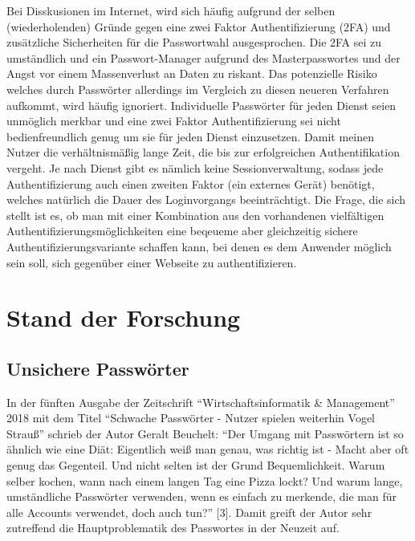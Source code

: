 Bei Disskusionen im Internet, wird sich häufig aufgrund der selben (wiederholenden) Gründe gegen eine zwei Faktor Authentifizierung (2FA) und zusätzliche Sicherheiten für die Passwortwahl ausgesprochen. Die 2FA sei zu umständlich und ein Passwort-Manager aufgrund des Masterpasswortes und der Angst vor einem Massenverlust an Daten zu riskant. Das potenzielle Risiko welches durch Passwörter allerdings im Vergleich zu diesen neueren Verfahren aufkommt, wird häufig ignoriert. Individuelle Passwörter für jeden Dienst seien unmöglich merkbar und eine zwei Faktor Authentifizierung sei nicht bedienfreundlich genug um sie für jeden Dienst einzusetzen. Damit meinen Nutzer die verhältnismäßig lange Zeit, die bis zur erfolgreichen Authentifikation vergeht. Je nach Dienst gibt es nämlich keine Sessionverwaltung, sodass jede Authentifizierung auch einen zweiten Faktor (ein externes Gerät) benötigt, welches natürlich die Dauer des Loginvorgangs beeinträchtigt. Die Frage, die sich stellt ist es, ob man mit einer Kombination aus den vorhandenen vielfältigen Authentifizierungsmöglichkeiten eine beqeueme aber gleichzeitig sichere Authentifizierungsvariante schaffen kann, bei denen es dem Anwender möglich sein soll, sich gegenüber einer Webseite zu authentifizieren.

\section{Stand der Forschung}
\subsection{Unsichere Passwörter}
In der fünften Ausgabe der Zeitschrift ``Wirtschaftsinformatik \& Management''  2018 mit dem Titel ``Schwache Passwörter - Nutzer spielen weiterhin Vogel Strauß'' schrieb der Autor Geralt Beuchelt: ``Der Umgang mit Passwörtern ist so ähnlich wie eine Diät: Eigentlich weiß man genau, was richtig ist - Macht aber oft genug das Gegenteil. Und nicht selten ist der Grund Bequemlichkeit. Warum selber kochen, wann nach einem langen Tag eine Pizza lockt? Und warum lange, umständliche Passwörter verwenden, wenn es einfach zu merkende, die man für alle Accounts verwendet, doch auch tun?'' [3]. Damit greift der Autor sehr zutreffend die Hauptproblematik des Passwortes in der Neuzeit auf.

\newpage

